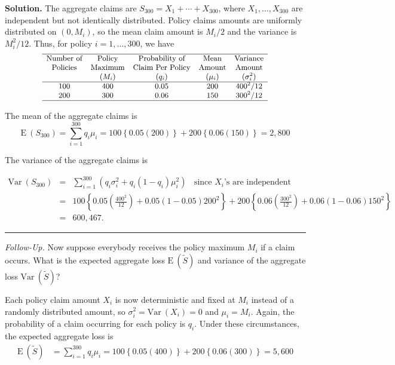 \documentclass[]{book}
\theoremstyle{definition}
\theoremstyle{definition}
\theoremstyle{definition}
\theoremstyle{remark}
\begin{document}
\hypertarget{toggleExampleAggLoss.2.1}{}
\textbf{Solution.} The aggregate claims are
\(S_{300} = X_1+\cdots+X_{300}\), where \(X_1, \ldots, X_{300}\) are
independent but not identically distributed. Policy claims amounts are
uniformly distributed on \((0,M_i)\), so the mean claim amount is
\(M_i/2\) and the variance is\(M_i^2/12\). Thus, for policy
\(i=1,\ldots,300\), we have \[
{\small 
\begin{matrix}
    \begin{array}{ccccc} \hline
        \text{Number of} & \text{Policy} & \text{Probability of} & \text{Mean} & \text{Variance}\\
        \text{Policies} &  \text{Maximum} &  \text{Claim Per Policy} & \text{Amount} & \text{Amount}\\
        & (M_i) & (q_{i}) & (\mu_{i}) & (\sigma_{i}^2) \\ \hline
        100 & 400 & 0.05 & 200 & 400^2/12\\
        200 & 300 & 0.06 & 150 & 300^2/12 \\ \hline
    \end{array}
\end{matrix}
}
\]

The mean of the aggregate claims is
\[\mathrm{E~} (S_{300}) = \sum_{i=1}^{300} q_i \mu_i = 100\left\{0.05(200)\right\} + 200\left\{0.06 (150) \right\} = 2,800\]

The variance of the aggregate claims is

\begin{eqnarray*}
    \mathrm{Var~}(S_{300}) &=& \sum_{i=1}^{300} \left( q_i \sigma _i^2+q_i (1-q_i)\mu_i^2 \right) ~~~~ \text{since } X_i \text{'s are independent} \\
    &=& 100\left\{ 0.05 \left(\frac{400^2}{12}\right) +0.05 (1-0.05 )200^2 \right\}+
    200\left\{
    0.06 \left(\frac{300^2}{12}\right) +0.06 (1-0.06 )150^2 \right\}\\
    &=& 600,467.
\end{eqnarray*}

\begin{center}\rule{0.5\linewidth}{\linethickness}\end{center}

\emph{Follow-Up.} Now suppose everybody receives the policy maximum
\(M_i\) if a claim occurs. What is the expected aggregate loss
\(\mathrm{E~}(\tilde{S})\) and variance of the aggregate loss
\(\mathrm{Var~}(\tilde{S})\)?

Each policy claim amount \(X_i\) is now deterministic and fixed at
\(M_i\) instead of a randomly distributed amount, so
\(\sigma_i^2 = \mathrm{Var~} (X_i) = 0\) and \(\mu_i = M_i\). Again, the
probability of a claim occurring for each policy is \(q_i\). Under these
circumstances, the expected aggregate loss is \[\begin{aligned}
\mathrm{E~}(\tilde{S}) &= \sum_{i=1}^{300} q_i \mu_i = 100 \left\{0.05(400) \right\} + 200 \left\{ 0.06(300) \right\} = 5,600
\end{aligned}\]
\end{document}
